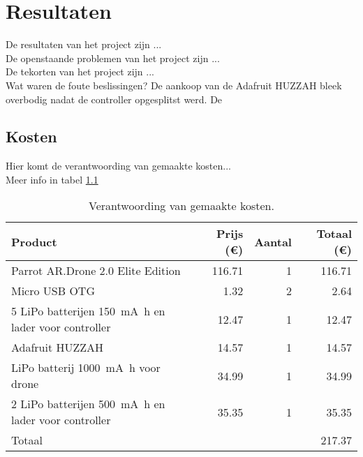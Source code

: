 \chapter{Resultaten}
De resultaten van het project zijn ...\\

De openstaande problemen van het project zijn ...\\

De tekorten van het project zijn ...\\

Wat waren de foute beslissingen?
De aankoop van de Adafruit HUZZAH bleek overbodig nadat de controller opgesplitst werd.
De 

\section{Kosten}
Hier komt de verantwoording van gemaakte kosten...\\

Meer info in tabel \ref{tab:kosten}
\begin{table}[p]
\centering
\begin{tabular}{ |l|r|r|r| } \hline
Product & Prijs (\euro{}) & Aantal & Totaal (\euro{}) \\ [.5ex] \hline \hline
Parrot AR.Drone 2.0 Elite Edition & 116.71 & 1 & 116.71 \\ \hline
Micro USB OTG & 1.32 & 2 & 2.64 \\ \hline
5 LiPo batterijen \SI{150}{\mA\hour} en lader voor controller & 12.47 & 1 & 12.47 \\ \hline
Adafruit HUZZAH & 14.57 & 1 & 14.57 \\ \hline
LiPo batterij \SI{1000}{\mA\hour} voor drone & 34.99 & 1 & 34.99 \\ \hline
2 LiPo batterijen \SI{500}{\mA\hour} en lader voor controller & 35.35 & 1 & 35.35 \\ [.5ex] \hline
\hline
Totaal & & & 217.37 \\ \hline
\end{tabular}
\caption[Kosten]{Verantwoording van gemaakte kosten.}
\label{tab:kosten}
\end{table}